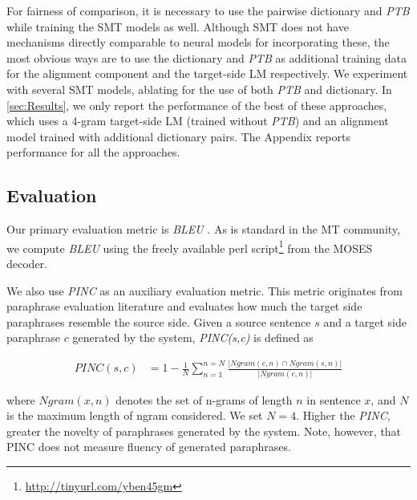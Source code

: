For fairness of comparison, it is necessary to use the pairwise dictionary and \textit{PTB} while training the SMT models as well. Although SMT does not have mechanisms directly comparable to neural models for incorporating these, the most obvious ways are to use the  dictionary and \textit{PTB} as additional training data for the alignment component and the target-side LM respectively. We experiment with several SMT models, ablating for the use of both \textit{PTB} and dictionary. In \ref{sec:Results}, we only report the performance of the best of these approaches, which uses a 4-gram target-side LM (trained without \textit{PTB}) and an alignment model trained with additional dictionary pairs. The Appendix reports performance for all the approaches.


\subsection{Evaluation}
Our primary evaluation metric is \emph{BLEU} \cite{papineni2002bleu} . As is standard in the MT community, we compute \emph{BLEU} using the freely available perl script\footnote{\url{http://tinyurl.com/yben45gm}} from the MOSES decoder.

We also use \emph{PINC} \cite{chen2011collecting} as an auxiliary evaluation metric. This metric originates from paraphrase evaluation literature and evaluates how much the target side paraphrases resemble the source side. Given a source sentence $s$ and a target side paraphrase $c$ generated by the system, \emph{PINC(s,c)} is defined as
\begin{center}
\scriptsize
\begin{align*}
    PINC(s,c)&=1-\frac{1}{N} \sum_{n=1}^{n=N} \frac{|Ngram(c,n) \cap Ngram(s,n)|}{|Ngram(c,n)|}
\end{align*}
\normalsize
\end{center}
where $Ngram(x,n)$ denotes the set of n-grams of length $n$ in sentence $x$, and $N$ is the maximum length of ngram considered. We set $N=4$. Higher the \textit{PINC}, greater the novelty of paraphrases generated by the system. Note, however, that PINC does not measure fluency of generated paraphrases.


